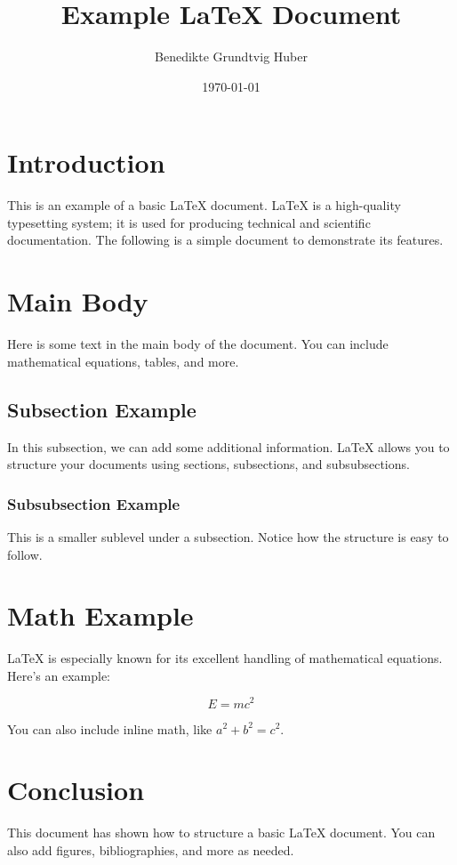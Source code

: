 \documentclass{article}
\title{Example LaTeX Document}
\author{Benedikte Grundtvig Huber}
\date{\today}
\begin{document}
\maketitle

\section{Introduction}

This is an example of a basic LaTeX document. LaTeX is a high-quality typesetting system; it is used for producing technical and scientific documentation. The following is a simple document to demonstrate its features.

\section{Main Body}

Here is some text in the main body of the document. You can include mathematical equations, tables, and more. 

\subsection{Subsection Example}

In this subsection, we can add some additional information. LaTeX allows you to structure your documents using sections, subsections, and subsubsections.

\subsubsection{Subsubsection Example}

This is a smaller sublevel under a subsection. Notice how the structure is easy to follow.

\section{Math Example}

LaTeX is especially known for its excellent handling of mathematical equations. Here's an example:

\[
E = mc^2
\]

You can also include inline math, like $a^2 + b^2 = c^2$.

\section{Conclusion}

This document has shown how to structure a basic LaTeX document. You can also add figures, bibliographies, and more as needed.
\end{document}
